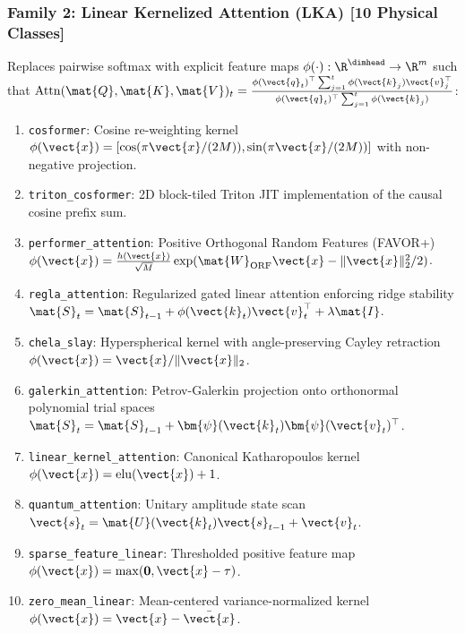 \subsubsection{Family 2: Linear Kernelized Attention (LKA) [10 Physical Classes]}
Replaces pairwise softmax with explicit feature maps $\phi(\cdot): \R^{\dimhead} \to \R^m$ such that $\operatorname{Attn}(\mat{Q}, \mat{K}, \mat{V})_t = \frac{\phi(\vect{q}_t)^\top \sum_{j=1}^t \phi(\vect{k}_j) \vect{v}_j^\top}{\phi(\vect{q}_t)^\top \sum_{j=1}^t \phi(\vect{k}_j)}$:
\begin{enumerate}
    \item \texttt{cosformer}: Cosine re-weighting kernel $\phi(\vect{x}) = [\cos(\pi \vect{x} / (2M)), \sin(\pi \vect{x} / (2M))]$ with non-negative projection.
    \item \texttt{triton\_cosformer}: 2D block-tiled Triton JIT implementation of the causal cosine prefix sum.
    \item \texttt{performer\_attention}: Positive Orthogonal Random Features (FAVOR+) $\phi(\vect{x}) = \frac{h(\vect{x})}{\sqrt{M}} \exp(\mat{W}_{\text{ORF}}\vect{x} - \|\vect{x}\|_2^2/2)$.
    \item \texttt{regla\_attention}: Regularized gated linear attention enforcing ridge stability $\mat{S}_t = \mat{S}_{t-1} + \phi(\vect{k}_t)\vect{v}_t^\top + \lambda \mat{I}$.
    \item \texttt{chela\_slay}: Hyperspherical kernel with angle-preserving Cayley retraction $\phi(\vect{x}) = \vect{x} / \|\vect{x}\|_2$.
    \item \texttt{galerkin\_attention}: Petrov-Galerkin projection onto orthonormal polynomial trial spaces $\mat{S}_t = \mat{S}_{t-1} + \bm{\psi}(\vect{k}_t) \bm{\psi}(\vect{v}_t)^\top$.
    \item \texttt{linear\_kernel\_attention}: Canonical Katharopoulos kernel $\phi(\vect{x}) = \operatorname{elu}(\vect{x}) + 1$.
    \item \texttt{quantum\_attention}: Unitary amplitude state scan $\vect{s}_t = \mat{U}(\vect{k}_t)\vect{s}_{t-1} + \vect{v}_t$.
    \item \texttt{sparse\_feature\_linear}: Thresholded positive feature map $\phi(\vect{x}) = \max(\mathbf{0}, \vect{x} - \tau)$.
    \item \texttt{zero\_mean\_linear}: Mean-centered variance-normalized kernel $\phi(\vect{x}) = \vect{x} - \bar{\vect{x}}$.
\end{enumerate}

